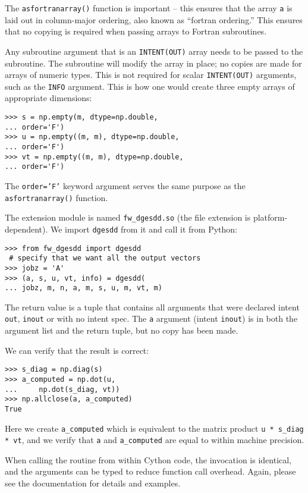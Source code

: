 \documentclass[letterpaper,11pt,english]{article}
\newcommand{\code}[1]{\texttt{#1}}
\begin{document}
The \code{asfortranarray()} function is important -- this ensures that
the array \code{a} is laid out in column-major ordering, also known as
``fortran ordering.''  This ensures that no copying is required when
passing arrays to Fortran subroutines.

Any subroutine argument that is an \code{INTENT(OUT)} array needs to be
passed to the subroutine.  The subroutine will modify the array in
place; no copies are made for arrays of numeric types.  This is not
required for scalar \code{INTENT(OUT)} arguments, such as the \code{INFO}
argument.  This is how one would create three empty arrays of
appropriate dimensions:

\begin{verbatim}
>>> s = np.empty(m, dtype=np.double,
... order='F')
>>> u = np.empty((m, m), dtype=np.double,
... order='F')
>>> vt = np.empty((m, m), dtype=np.double,
... order='F')
\end{verbatim}

The \code{order='F'} keyword argument serves the same purpose as the
\code{asfortranarray()} function.

The extension module is named \code{fw\_dgesdd.so} (the file extension is
platform-dependent).  We import \code{dgesdd} from it and call it from
Python:

\begin{verbatim}
>>> from fw_dgesdd import dgesdd
 # specify that we want all the output vectors
>>> jobz = 'A'
>>> (a, s, u, vt, info) = dgesdd(
... jobz, m, n, a, m, s, u, m, vt, m)
\end{verbatim}

The return value is a tuple that contains all arguments that were
declared intent \code{out}, \code{inout} or with no intent spec.  The
\code{a} argument (intent \code{inout}) is in both the argument list and
the return tuple, but no copy has been made.

We can verify that the result is correct:

\begin{verbatim}
>>> s_diag = np.diag(s)
>>> a_computed = np.dot(u, 
...     np.dot(s_diag, vt))
>>> np.allclose(a, a_computed)
True
\end{verbatim}

Here we create \code{a\_computed} which is equivalent to the matrix
product \code{u * s\_diag * vt}, and we verify that \code{a} and
\code{a\_computed} are equal to within machine precision.

When calling the routine from within Cython code, the invocation is
identical, and the arguments can be typed to reduce function call
overhead.  Again, please see the documentation for details and
examples.
\end{document}
